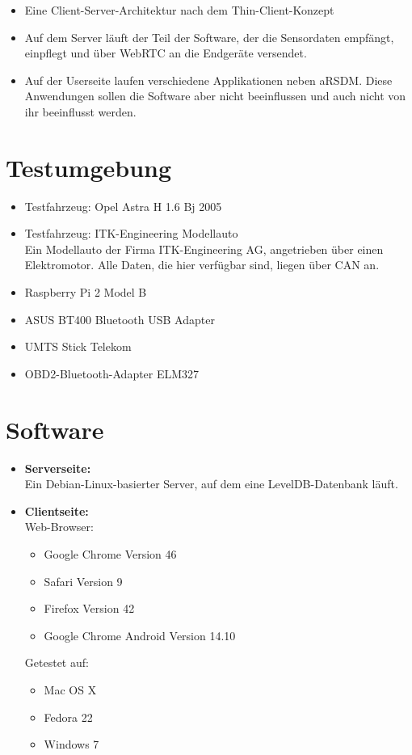 \documentclass[pflichtenheft.tex]{subfiles}
\begin{document}
\begin{itemize}

\item
Eine Client-Server-Architektur nach dem Thin-Client-Konzept
\item
Auf dem Server läuft der Teil der Software, der die Sensordaten empfängt, einpflegt und über WebRTC an die Endgeräte versendet.
\item
Auf der Userseite laufen verschiedene Applikationen neben aRSDM. Diese Anwendungen sollen die Software aber nicht beeinflussen und auch nicht von ihr beeinflusst werden.
\end{itemize}

\section*{Testumgebung}
\begin{itemize}
\item
Testfahrzeug: Opel Astra H 1.6 Bj 2005 %
\item
Testfahrzeug: ITK-Engineering Modellauto \\
Ein Modellauto der Firma ITK-Engineering AG, angetrieben über einen Elektromotor. Alle Daten, die hier verfügbar sind, liegen über CAN an.
\item
Raspberry Pi 2 Model B
\item
ASUS BT400 Bluetooth USB Adapter
\item
UMTS Stick Telekom
\item
OBD2-Bluetooth-Adapter ELM327

\end{itemize}


\section{Software}
\begin{itemize}
\item
\textbf{Serverseite:}\\
Ein Debian-Linux-basierter Server, auf dem eine LevelDB-Datenbank läuft.
\item
\textbf{Clientseite:}\\
Web-Browser:
\begin{itemize}
\item
Google Chrome Version 46
\item
Safari Version 9
\item
Firefox Version 42
\item
Google Chrome Android Version 14.10
\end{itemize}
Getestet auf:
\begin{itemize}
\item
Mac OS X
\item
Fedora 22
\item
Windows 7
\end{itemize}
\end{itemize}
\end{document}
